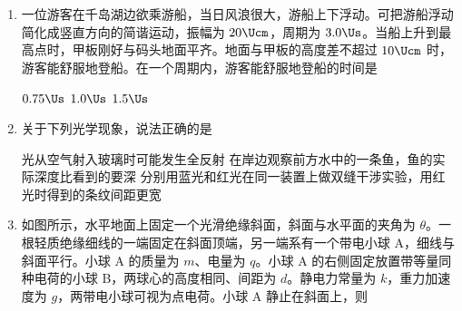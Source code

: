 \documentclass[\gkver]{gaokaozhenti}
\begin{document}
\begin{enumerate}
{25 天}
{35 天}
{45 天}


\item
一位游客在千岛湖边欲乘游船，当日风浪很大，游船上下浮动。可把游船浮动简化成竖直方向的简谐运动，振幅为 $20\Ucm$，周期为 $3.0\Us$。当船上升到最高点时，甲板刚好与码头地面平齐。地面与甲板的高度差不超过 $10\Ucm$ 时，游客能舒服地登船。在一个周期内，游客能舒服地登船的时间是

\fourchoices[answer=C]
{$0.5\Us$}
{$0.75\Us$}
{$1.0\Us$}
{$1.5\Us$}


\item
关于下列光学现象，说法正确的是

{光从空气射入玻璃时可能发生全反射}
{在岸边观察前方水中的一条鱼，鱼的实际深度比看到的要深}
{分别用蓝光和红光在同一装置上做双缝干涉实验，用红光时得到的条纹间距更宽}


\item
如图所示，水平地面上固定一个光滑绝缘斜面，斜面与水平面的夹角为 $\theta$。一根轻质绝缘细线的一端固定在斜面顶端，另一端系有一个带电小球 A，细线与斜面平行。小球 A 的质量为 $m$、电量为 $q$。小球 A 的右侧固定放置带等量同种电荷的小球 B，两球心的高度相同、间距为 $d$。静电力常量为 $k$，重力加速度为 $g$，两带电小球可视为点电荷。小球 A 静止在斜面上，则


\end{enumerate}
\end{document}
